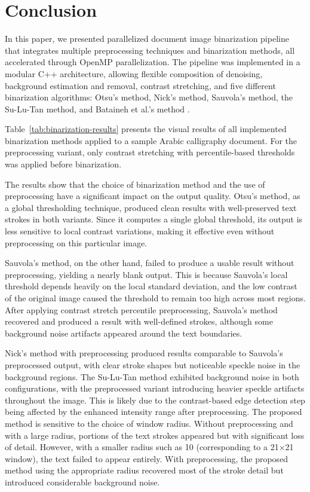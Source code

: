 \section{Conclusion}

In this paper, we presented parallelized document image binarization pipeline that integrates multiple preprocessing techniques and binarization methods, all accelerated through OpenMP parallelization. The pipeline was implemented in a modular C++ architecture, allowing flexible composition of denoising, background estimation and removal, contrast stretching, and five different binarization algorithms: Otsu's method, Nick's method, Sauvola's method, the Su-Lu-Tan method, and Bataineh et al.'s method \cite{Bataineh2011}.

Table~\ref{tab:binarization-results} presents the visual results of all implemented binarization methods applied to a sample Arabic calligraphy document. For the preprocessing variant, only contrast stretching with percentile-based thresholds was applied before binarization.

The results show that the choice of binarization method and the use of preprocessing have a significant impact on the output quality. Otsu's method, as a global thresholding technique, produced clean results with well-preserved text strokes in both variants. Since it computes a single global threshold, its output is less sensitive to local contrast variations, making it effective even without preprocessing on this particular image.

Sauvola's method, on the other hand, failed to produce a usable result without preprocessing, yielding a nearly blank output. This is because Sauvola's local threshold depends heavily on the local standard deviation, and the low contrast of the original image caused the threshold to remain too high across most regions. After applying contrast stretch percentile preprocessing, Sauvola's method recovered and produced a result with well-defined strokes, although some background noise artifacts appeared around the text boundaries.

Nick's method with preprocessing produced results comparable to Sauvola's preprocessed output, with clear stroke shapes but noticeable speckle noise in the background regions. The Su-Lu-Tan method exhibited background noise in both configurations, with the preprocessed variant introducing heavier speckle artifacts throughout the image. This is likely due to the contrast-based edge detection step being affected by the enhanced intensity range after preprocessing. The proposed method is sensitive to the choice of window radius. Without preprocessing and with a large radius, portions of the text strokes appeared but with significant loss of detail. However, with a smaller radius such as 10 (corresponding to a 21$\times$21 window), the text failed to appear entirely. With preprocessing, the proposed method using the appropriate radius recovered most of the stroke detail but introduced considerable background noise.


